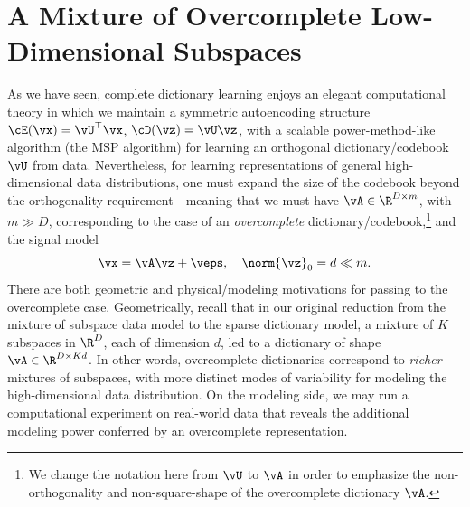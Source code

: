 \documentclass[../../book-main.tex]{subfiles}
\begin{document}
\section{A Mixture of Overcomplete Low-Dimensional Subspaces}
\label{sec:dictionary_learning}
As we have seen, complete dictionary learning enjoys an elegant
computational theory in which we maintain a symmetric autoencoding
structure $\cE(\vx) = \vU^\top \vx$, $\cD(\vz) = \vU \vz$, with a
scalable power-method-like algorithm (the MSP algorithm) for learning
an orthogonal dictionary/codebook $\vU$ from data. Nevertheless, for
learning representations of general high-dimensional data
distributions, one must expand the size of the codebook beyond the
orthogonality requirement---meaning that we must have $\vA \in \R^{D
\times m}$, with $m \gg D$, corresponding to the case of an
\textit{overcomplete} dictionary/codebook,\footnote{We change the
    notation here from $\vU$ to $\vA$ in order to emphasize the
    non-orthogonality and non-square-shape of the overcomplete dictionary
$\vA$.} and the signal model
\begin{equation}\label{eq:model-DL-overcomplete}
    \vx =  \vA \vz + \veps,
    \quad
    \norm{\vz}_0 = d \ll m.
\end{equation}
There are both geometric and physical/modeling motivations for
passing to the overcomplete case.
Geometrically, recall that in our original reduction from the mixture
of subspace data model to the sparse dictionary model, a mixture of
$K$ subspaces in $\R^D$, each of dimension $d$, led to a dictionary
of shape $\vA \in \R^{D \times Kd}$.
In other words, overcomplete dictionaries correspond to
\textit{richer} mixtures of subspaces, with more distinct modes of
variability for modeling the high-dimensional data distribution.
On the modeling side, we may run a computational experiment on
real-world data that reveals the additional modeling power conferred
by an overcomplete representation.
\end{document}
